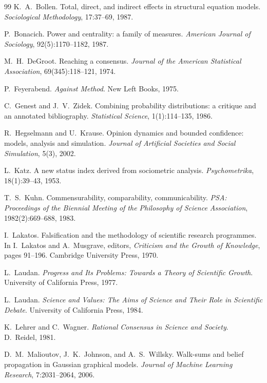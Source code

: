 \documentclass[runningheads]{llncs}
\begin{document}
\begin{thebibliography}{99}
K.~A.~Bollen.
Total, direct, and indirect effects in structural equation models.
\emph{Sociological Methodology}, 17:37--69, 1987.

P.~Bonacich.
Power and centrality: a family of measures.
\emph{American Journal of Sociology}, 92(5):1170--1182, 1987.

M.~H.~DeGroot.
Reaching a consensus. \emph{Journal of the American Statistical Association}, 69(345):118--121, 1974.

P.~Feyerabend.
\emph{Against Method}. New Left Books, 1975.

C.~Genest and J.~V.~Zidek.
Combining probability distributions: a critique and an annotated bibliography.
\emph{Statistical Science}, 1(1):114--135, 1986.

R.~Hegselmann and U.~Krause.
Opinion dynamics and bounded confidence: models, analysis and simulation.
\emph{Journal of Artificial Societies and Social Simulation}, 5(3), 2002.

L.~Katz.
A new status index derived from sociometric analysis. \emph{Psychometrika}, 18(1):39--43, 1953.

T.~S.~Kuhn.
Commensurability, comparability, communicability.
\emph{PSA: Proceedings of the Biennial Meeting of the Philosophy of Science Association},
1982(2):669--688, 1983.

I.~Lakatos.
Falsification and the methodology of scientific research programmes.
In I.~Lakatos and A.~Musgrave, editors, \emph{Criticism and the Growth of Knowledge},
pages 91--196. Cambridge University Press, 1970.

L.~Laudan.
\emph{Progress and Its Problems: Towards a Theory of Scientific Growth}.
University of California Press, 1977.

L.~Laudan.
\emph{Science and Values: The Aims of Science and Their Role in Scientific Debate}.
University of California Press, 1984.

K.~Lehrer and C.~Wagner.
\emph{Rational Consensus in Science and Society}. D.~Reidel, 1981.

D.~M.~Malioutov, J.~K.~Johnson, and A.~S.~Willsky.
Walk-sums and belief propagation in Gaussian graphical models.
\emph{Journal of Machine Learning Research}, 7:2031--2064, 2006.


\end{thebibliography}
\end{document}
